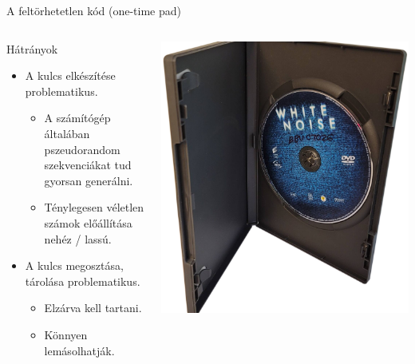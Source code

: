 \documentclass[12 pt]{beamer}
\begin{document}

\begin{frame}{A feltörhetetlen kód (one-time pad)}
  \begin{columns}
    \begin{column}{0.55\textwidth}
      \begin{block}{Hátrányok}
        \begin{itemize}
          \item{A kulcs elkészítése problematikus.}
            \begin{itemize}
              \item{A számítógép általában pszeudorandom szekvenciákat tud gyorsan generálni.}
              \item{Ténylegesen véletlen számok előállítása nehéz / lassú.}
            \end{itemize}
          \item{A kulcs megosztása, tárolása problematikus.}
            \begin{itemize}
              \item{Elzárva kell tartani.}
              \item{Könnyen lemásolhatják.}
            \end{itemize}
        \end{itemize}
      \end{block}
    \end{column}
    \begin{column}{0.44\textwidth}
\includegraphics[width=\textwidth]{whitenoise}
    \end{column}
  \end{columns}
\end{frame}
\end{document}
